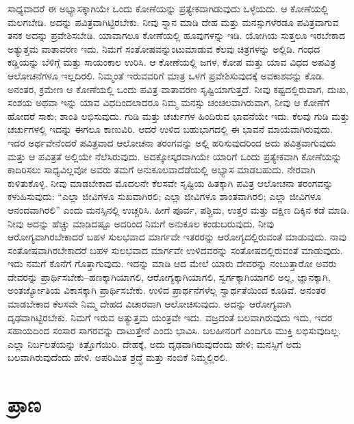 ಸಾಧ್ಯವಾದರೆ ಈ ಅಭ್ಯಾಸಕ್ಕಾಗಿಯೇ ಒಂದು ಕೋಣೆಯನ್ನು ಪ್ರತ್ಯೇಕವಾಗಿಡುವುದು ಒಳ್ಳೆಯದು. ಆ ಕೋಣೆಯಲ್ಲಿ ಮಲಗಬೇಡಿ. ಅದನ್ನು ಪವಿತ್ರವಾಗಿಟ್ಟಿರಬೇಕು. ನೀವು ಸ್ನಾನ ಮಾಡಿ ದೇಹ ಮತ್ತು ಮನಸ್ಸುಗಳೆರಡೂ ಪವಿತ್ರವಾಗುವ ತನಕ ಅದನ್ನು ಪ್ರವೇಶಿಸಬೇಡಿ. ಯಾವಾಗಲೂ ಕೋಣೆಯಲ್ಲಿ ಹೂವುಗಳನ್ನು ಇಡಿ. ಯೋಗಿಯ ಸುತ್ತಲೂ ಇರಬೇಕಾದ ಅತ್ಯುತ್ತಮ ವಾತಾವರಣ ಇದು. ನಿಮಗೆ ಸಂತೋಷವನ್ನುಂಟುಮಾಡುವ ಕೆಲವು ಚಿತ್ರಗಳನ್ನು ಅಲ್ಲಿಡಿ. ಗಂಧದ ಕಡ್ಡಿಯನ್ನು ಬೆಳಿಗ್ಗೆ ಮತ್ತು ಸಾಯಂಕಾಲ ಉರಿಸಿ. ಆ ಕೋಣೆಯಲ್ಲಿ ಜಗಳ, ಕೋಪ ಮತ್ತು ಯಾವ ವಿಧದ ಅಪವಿತ್ರ ಆಲೋಚನೆಗಳೂ ಇಲ್ಲದಿರಲಿ. ನಿಮ್ಮಂತೆ ಇರುವವರಿಗೆ ಮಾತ್ರ ಒಳಗೆ ಪ್ರವೇಶಿಸುವುದಕ್ಕೆ ಅವಕಾಶವನ್ನು ಕೊಡಿ. ಅನಂತರ, ಕ್ರಮೇಣ ಆ ಕೋಣೆಯಲ್ಲಿ ಒಂದು ಪವಿತ್ರ ವಾತಾವರಣ ಸೃಷ್ಟಿಯಾಗುತ್ತದೆ. ನೀವು ಕಷ್ಟದಲ್ಲಿರುವಾಗ, ದುಃಖ, ಸಂಶಯ ಅಥವಾ ಇನ್ನು ಯಾವ ವಿಧದಿಂದಲಾದರೂ ನಿಮ್ಮ ಮನಸ್ಸು ಚಂಚಲವಾಗಿರುವಾಗ, ನೀವು ಆ ಕೋಣೆಗೆ ಹೋದರೆ ಸಾಕು; ಶಾಂತಿ ಲಭಿಸುವುದು. ಗುಡಿ ಮತ್ತು ಚರ್ಚುಗಳ ಹಿಂದಿರುವ ಭಾವನೆಯೇ ಇದು. ಕೆಲವು ಗುಡಿ ಮತ್ತು ಚರ್ಚುಗಳಲ್ಲಿ ಇದನ್ನು ಈಗಲೂ ಕಾಣುವಿರಿ. ಆದರೆ ಉಳಿದ ಬಹುಭಾಗದಲ್ಲಿ ಈ ಭಾವನೆ ಮಾಯವಾಗಿರುವುದು. ಇದರ ಅರ್ಥವೇನೆಂದರೆ ಪವಿತ್ರವಾದ ಆಲೋಚನಾ ತರಂಗವನ್ನು ಅಲ್ಲಿ ಹರಿಸುವುದರಿಂದ ಅದು ಪವಿತ್ರವಾಗುವುದು ಮತ್ತು ಆ ಪವಿತ್ರತೆ ಅಲ್ಲಿಯೇ ನೆಲೆಸಿರುವುದು. ಅದಕ್ಕೋಸ್ಕರವಾಗಿಯೇ ಯಾರಿಗೆ ಒಂದು ಪ್ರತ್ಯೇಕವಾಗಿ ಕೋಣೆಯನ್ನು ಕಾದಿರಿಸಲು ಸಾಧ್ಯವಿಲ್ಲವೋ ಅವರು ತಮಗೆ ಅನುಕೂಲವಾದೆಡೆಯಲ್ಲಿ ಅಭ್ಯಾಸ ಮಾಡಬಹುದು. ನೇರವಾಗಿ ಕುಳಿತುಕೊಳ್ಳಿ. ನೀವು ಮಾಡಬೇಕಾದ ಮೊದಲನೇ ಕೆಲಸವೇ ಸೃಷ್ಟಿಯ ಹಿತಕ್ಕಾಗಿ ಪವಿತ್ರ ಆಲೋಚನಾ ತರಂಗವನ್ನು ಕಳುಹಿಸುವುದು: “ಎಲ್ಲಾ ಜೀವಿಗಳೂ ಸುಖವಾಗಿರಲಿ; ಎಲ್ಲಾ ಜೀವಿಗಳೂ ಶಾಂತವಾಗಿರಲಿ; ಎಲ್ಲಾ ಜೀವಿಗಳೂ ಆನಂದವಾಗಿರಲಿ” ಎಂದು ಮನಸ್ಸಿನಲ್ಲಿ ಉಚ್ಚರಿಸಿ. ಹೀಗೆ ಪೂರ್ವ, ಪಶ್ಚಿಮ, ಉತ್ತರ ಮತ್ತು ದಕ್ಷಿಣ ದಿಕ್ಕಿನ ಕಡೆ ಮಾಡಿ. ನೀವು ಅದನ್ನು ಹೆಚ್ಚು ಮಾಡಿದಷ್ಟೂ ಅದರಿಂದ ನಿಮಗೆ ಅನುಕೂಲ ಕಂಡುಬರುವುದು. ನೀವು ಆರೋಗ್ಯವಾಗಿರಬೇಕಾದರೆ ಬಹಳ ಸುಲಭವಾದ ಮಾರ್ಗವೇ ಇತರರನ್ನು ಆರೋಗ್ಯದಲ್ಲಿರುವಂತೆ ಮಾಡುವುದು. ನಾವು ಸಂತೋಷವಾಗಿರಬೇಕಾದರೆ ಬಹಳ ಸುಲಭವಾದ ಮಾರ್ಗವೇ ಉಳಿದವರನ್ನು ಸಂತೋಷದಲ್ಲಿರುವಂತೆ ಮಾಡುವುದು. ಇದು ನಮಗೆ ಕೊನೆಗೆ ಗೊತ್ತಾಗುವುದು. ಇದನ್ನು ಮಾಡಿ ಆದ ಮೇಲೆ ಯಾರು ದೇವರನ್ನು ನಂಬುತ್ತಾರೋ ಅವರು ದೇವರನ್ನು ಪ್ರಾರ್ಥಿಸಬೇಕು–ಹಣಕ್ಕಾಗಿಯಾಗಲಿ, ಆರೋಗ್ಯಕ್ಕಾಗಿಯಾಗಲಿ, ಸ್ವರ್ಗಕ್ಕಾಗಿಯಾಗಲಿ ಅಲ್ಲ, ಜ್ಞಾನಕ್ಕಾಗಿ, ಅಂತರ್ಜ್ಯೋತಿಯ ವಿಕಾಸಕ್ಕಾಗಿ ಪ್ರಾರ್ಥಿಸಬೇಕು. ಉಳಿದ ಪ್ರಾರ್ಥನೆಗಳೆಲ್ಲ ಸ್ವಾರ್ಥತೆಯಿಂದ ಕೂಡಿವೆ. ಅನಂತರ ಮಾಡಬೇಕಾದ ಕೆಲಸವೇ ನಿಮ್ಮ ದೇಹದ ವಿಚಾರವಾಗಿ ಆಲೋಚಿಸುವುದು. ಅದನ್ನು ಆರೋಗ್ಯವಾಗಿ ದೃಢವಾಗಿಟ್ಟಿರಬೇಕು. ನಿಮಗೆ ಇರುವ ಅತ್ಯುತ್ತಮ ಯಂತ್ರವೇ ಇದು. ವಜ್ರದಂತೆ ಬಲವಾಗಿರುವುದು ಇದು, ಇದರ ಸಹಾಯದಿಂದ ಸಂಸಾರ ಸಾಗರವನ್ನು ದಾಟುತ್ತೇನೆ ಎಂದು ಭಾವಿಸಿ. ಬಲಹೀನರಿಗೆ ಎಂದಿಗೂ ಮುಕ್ತಿ ಲಭಿಸುವುದಿಲ್ಲ. ಎಲ್ಲಾ ನಿರ್ಬಲತೆಯನ್ನು ಕಿತ್ತೊಗೆಯಿರಿ. ದೇಹಕ್ಕೆ, ಅದು ದೃಢವಾಗಿರುವುದೆಂದು ಹೇಳಿ; ಮನಸ್ಸಿಗೆ ಅದು ಬಲವಾಗಿರುವುದೆಂದು ಹೇಳಿ. ಅಪರಿಮಿತ ಶ್ರದ್ಧೆ ಮತ್ತು ನಂಬಿಕೆ ನಿಮ್ಮಲ್ಲಿರಲಿ.

\chapter{ಪ್ರಾಣ}

